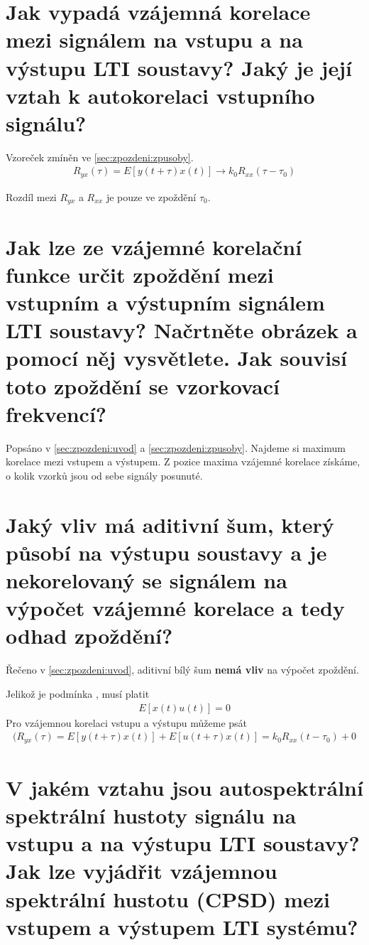 \documentclass[a4paper,12pt]{article}   %
\newcommand{\mt}[1]{$#1$}
\begin{document}
\section{Jak vypadá vzájemná korelace mezi signálem na vstupu a na výstupu LTI soustavy? Jaký je její vztah k autokorelaci vstupního signálu?}
Vzoreček zmíněn ve \ref{sec:zpozdeni:zpusoby}.
\begin{align*}
        R_{yx}(\tau) = E[y(t+\tau)x(t)] \rightarrow k_0R_{xx}(\tau-\tau_0)
\end{align*}

Rozdíl mezi \mt{R_{yx}} a \mt{R_{xx}} je pouze ve zpoždění \mt{\tau_0}.


\section{Jak lze ze vzájemné korelační funkce určit zpoždění mezi vstupním a výstupním signálem LTI soustavy? Načrtněte obrázek a pomocí něj vysvětlete. Jak souvisí toto zpoždění se vzorkovací frekvencí?}
Popsáno v \ref{sec:zpozdeni:uvod} a \ref{sec:zpozdeni:zpusoby}. Najdeme si maximum korelace mezi vstupem a výstupem. Z pozice maxima vzájemné korelace získáme, o kolik vzorků jsou od sebe signály posunuté.


\section{Jaký vliv má aditivní šum, který působí na výstupu soustavy a je nekorelovaný se signálem na výpočet vzájemné korelace a tedy odhad zpoždění?}
Řečeno v \ref{sec:zpozdeni:uvod}, aditivní bílý šum \textbf{nemá vliv} na výpočet zpoždění. 

Jelikož je podmínka , musí platit
\begin{align*}
        E[x(t)u(t)] = 0
\end{align*}
Pro vzájemnou korelaci vstupu a výstupu můžeme psát
\begin{align*}(
        R_{yx}(\tau) = E[y(t+\tau)x(t)] + E[u(t+\tau)x(t)] = k_0R_{xx}(t-\tau_0) + 0 
\end{align*}


\section{V jakém vztahu jsou autospektrální spektrální hustoty signálu na vstupu a na výstupu LTI soustavy? Jak lze vyjádřit vzájemnou spektrální hustotu (CPSD) mezi vstupem a výstupem LTI systému?} \label{sec:zpozdeni:SyxRyx}
\end{document}
